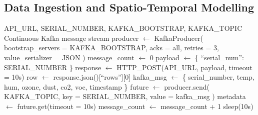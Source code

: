 \begin{appendices}
\renewcommand{\chaptername}{Appendix}
\chapter{}
\label{app:algorithms}
\setcounter{algorithm}{0}
\renewcommand{\thealgorithm}{\thechapter.\arabic{algorithm}}

\section{Data Ingestion and Spatio-Temporal Modelling}

\begin{algorithm}[H]
\caption{Active Sensor to Kafka Ingestion Loop}
\label{alg:plalion_kafka}
\begin{algorithmic}[1]
\Require API\_URL, SERIAL\_NUMBER, KAFKA\_BOOTSTRAP, KAFKA\_TOPIC
\Ensure Continuous Kafka message stream
\State producer $\gets$ KafkaProducer(
\Statex \hspace{1.5em} bootstrap\_servers = KAFKA\_BOOTSTRAP,
\Statex \hspace{1.5em} acks = all,
\Statex \hspace{1.5em} retries = 3,
\Statex \hspace{1.5em} value\_serializer = JSON
\Statex )
\State message\_count $\gets$ 0
    \State payload $\gets$ \{ ``serial\_num'': SERIAL\_NUMBER \}
    \State response $\gets$ HTTP\_POST(API\_URL, payload, timeout = 10s)
        \State row $\gets$ response.json()[``rows''][0]
        \State kafka\_msg $\gets$ \{
        \Statex \hspace{2em} serial\_number, temp, hum, ozone,
        \Statex \hspace{2em} dust, co2, voc, timestamp
        \Statex \hspace{1em} \}
        \State future $\gets$ producer.send(
        \Statex \hspace{2em} KAFKA\_TOPIC,
        \Statex \hspace{2em} key = SERIAL\_NUMBER,
        \Statex \hspace{2em} value = kafka\_msg
        \Statex \hspace{1em} )
        \State metadata $\gets$ future.get(timeout = 10s)
        \State message\_count $\gets$ message\_count + 1
    \EndIf
    \State sleep(10s)
\EndWhile
\end{algorithmic}
\end{algorithm}


\end{appendices}
